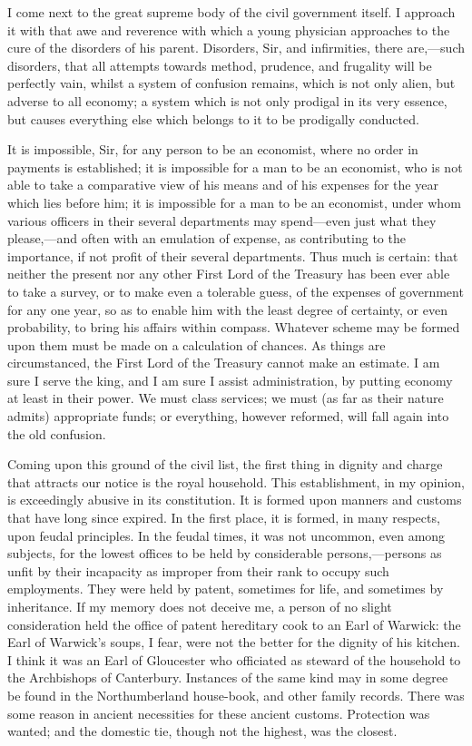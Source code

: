 I come next to the great supreme body of the civil government itself. I approach it with that awe and reverence with which a young physician approaches to the cure of the disorders of his parent. Disorders, Sir, and infirmities, there are,—such disorders, that all attempts towards method, prudence, and frugality will be perfectly vain, whilst a system of confusion remains, which is not only alien, but adverse to all economy; a system which is not only prodigal in its very essence, but causes everything else which belongs to it to be prodigally conducted.

It is impossible, Sir, for any person to be an economist, where no order in payments is established; it is impossible for a man to be an economist, who is not able to take a comparative view of his means and of his expenses for the year which lies before him; it is impossible for a man to be an economist, under whom various officers in their several departments may spend—even just what they please,—and often with an emulation of expense, as contributing to the importance, if not profit of their several departments. Thus much is certain: that neither the present nor any other First Lord of the Treasury has been ever able to take a survey, or to make even a tolerable guess, of the expenses of government for any one year, so as to enable him with the least degree of certainty, or even probability, to bring his affairs within compass. Whatever scheme may be formed upon them must be made on a calculation of chances. As things are circumstanced, the First Lord of the Treasury cannot make an estimate. I am sure I serve the king, and I am sure I assist administration, by putting economy at least in their power. We must class services; we must (as far as their nature admits) appropriate funds; or everything, however reformed, will fall again into the old confusion.

Coming upon this ground of the civil list, the first thing in dignity and charge that attracts our notice is the royal household. This establishment, in my opinion, is exceedingly abusive in its constitution. It is formed upon manners and customs that have long since expired. In the first place, it is formed, in many respects, upon feudal principles. In the feudal times, it was not uncommon, even among subjects, for the lowest offices to be held by considerable persons,—persons as unfit by their incapacity as improper from their rank to occupy such employments. They were held by patent, sometimes for life, and sometimes by inheritance. If my memory does not deceive me, a person of no slight consideration held the office of patent hereditary cook to an Earl of Warwick: the Earl of Warwick's soups, I fear, were not the better for the dignity of his kitchen. I think it was an Earl of Gloucester who officiated as steward of the household to the Archbishops of Canterbury. Instances of the same kind may in some degree be found in the Northumberland house-book, and other family records. There was some reason in ancient necessities for these ancient customs. Protection was wanted; and the domestic tie, though not the highest, was the closest.

